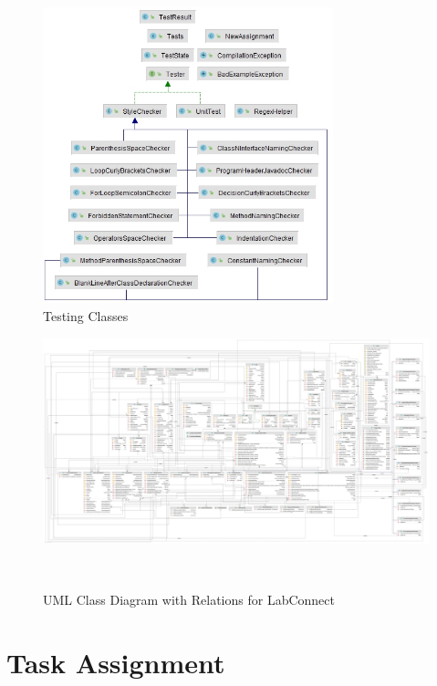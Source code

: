 \documentclass[a4paper, 12pt]{article}
\begin{document}
        \begin{figure}[H]
            \centering
            \includegraphics[width=0.75\textwidth]{small-groups/testing.jpg}
                \caption{Testing Classes}
        \end{figure}

    \pagebreak

    \begin{landscape}
        \begin{figure}
            \centering
            \includegraphics[width=\dimexpr\paperheight-6cm\relax]{UML.jpg}
            \caption{UML Class Diagram with Relations for LabConnect}~\label{fig:class-diagram}
        \end{figure}
    \end{landscape}

    \pagebreak


    \section{Task Assignment}
\end{document}
